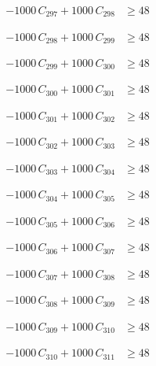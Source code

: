 \documentclass[a4paper,11pt]{article}
\begin{document}
\begin{align}
-1000\,C_{297} + 1000\,C_{298} &\geq 48 \nonumber
\end{align}

\begin{align}
-1000\,C_{298} + 1000\,C_{299} &\geq 48 \nonumber
\end{align}

\begin{align}
-1000\,C_{299} + 1000\,C_{300} &\geq 48 \nonumber
\end{align}

\begin{align}
-1000\,C_{300} + 1000\,C_{301} &\geq 48 \nonumber
\end{align}

\begin{align}
-1000\,C_{301} + 1000\,C_{302} &\geq 48 \nonumber
\end{align}

\begin{align}
-1000\,C_{302} + 1000\,C_{303} &\geq 48 \nonumber
\end{align}

\begin{align}
-1000\,C_{303} + 1000\,C_{304} &\geq 48 \nonumber
\end{align}

\begin{align}
-1000\,C_{304} + 1000\,C_{305} &\geq 48 \nonumber
\end{align}

\begin{align}
-1000\,C_{305} + 1000\,C_{306} &\geq 48 \nonumber
\end{align}

\begin{align}
-1000\,C_{306} + 1000\,C_{307} &\geq 48 \nonumber
\end{align}

\begin{align}
-1000\,C_{307} + 1000\,C_{308} &\geq 48 \nonumber
\end{align}

\begin{align}
-1000\,C_{308} + 1000\,C_{309} &\geq 48 \nonumber
\end{align}

\begin{align}
-1000\,C_{309} + 1000\,C_{310} &\geq 48 \nonumber
\end{align}

\begin{align}
-1000\,C_{310} + 1000\,C_{311} &\geq 48 \nonumber
\end{align}
\end{document}
